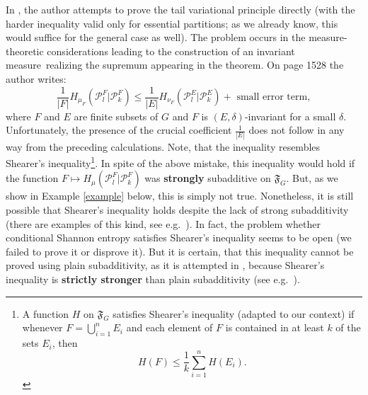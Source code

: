 \documentclass[12pt]{amsart}
\theoremstyle{definition}
\numberwithin{equation}{section}
\newcommand{\GF}{\mathfrak{F}}
\def \P {\mathcal P}
\def \im {invariant measure}
\def \P {\mathcal P}
\def \im {invariant measure}
\begin{document}
In \cite{Zhou}, the author attempts to prove the tail variational principle directly (with the harder inequality valid only for essential partitions; as we already know, this would suffice for the general case as well). The problem occurs in the measure-theoretic considerations leading to the construction of an \im\ realizing the supremum appearing in the theorem. On page 1528 the author writes:
$$
\frac1{|F|}H_{\mu_F}(\P_l^F|\P_k^F)\le \frac1{|E|}H_{\nu_F}(\P_l^E|\P_k^E)+ \text{ small error term},
$$
where $F$ and $E$ are finite subsets of $G$ and $F$ is $(E,\delta)$-invariant for a small $\delta$. Unfortunately, the presence of the crucial coefficient $\frac1{|E|}$ does not follow in any way from the preceding calculations. Note, that the inequality resembles  Shearer's inequality\footnote{
A function $H$ on $\GF_G$ satisfies Shearer's inequality (adapted to our context) if whenever $F=\bigcup_{i=1}^n E_i$ and each element of $F$ is contained in at least $k$ of the sets $E_i$, then
$$
H(F)\le\frac1k\sum_{i=1}^nH(E_i).
$$
}.
In spite of the above mistake, this inequality would hold if the function $F\mapsto H_\mu(\P_l^F|\P_k^F)$ was {\bf strongly} subadditive on $\mathfrak F_G$. But, as we show in Example \ref{example} below, this is simply not true. Nonetheless, it is still possible that Shearer's inequality holds despite the lack of strong subadditivity (there are examples of this kind, see e.g.\ \cite[Example 6.4]{DFR}). In fact, the problem whether conditional Shannon entropy satisfies Shearer's inequality seems to be open (we failed to prove it or disprove it). But it is certain, that this inequality cannot be proved using plain subadditivity, as it is attempted in \cite{Zhou}, because Shearer's inequality is {\bf strictly stronger} than plain subadditivity (see e.g.\ \cite[Example 6.5]{DFR}). 
\end{document}
